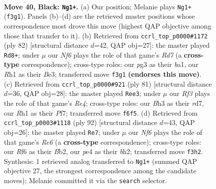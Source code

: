 \documentclass[11pt]{article}
\begin{document}
\clearpage

\begin{figure}[p]\centering
\begin{subfigure}{0.46\textwidth}\centering
\resizebox{\linewidth}{!}{%
\newchessgame
\chessboard[
  setfen={7k/R4p1p/3P1rp1/8/1p2P3/5nPb/4K2P/7r b - - 0 40},
  showmover=false,
  pgfstyle=straightmove, color=movearrow, markmove={f3-g1}
]}
\caption{}
\end{subfigure}\hfill
\begin{subfigure}{0.46\textwidth}\centering
\resizebox{\linewidth}{!}{%
\newchessgame
\chessboard[
  setfen={6k1/3R3p/2rN2p1/p1n5/P1p3P1/4B2P/5P2/b4K2 w - - 5 42},
  showmover=false,
  pgfstyle=straightmove, color=movearrow, markmove={d7-d8}
]}
\caption{}
\end{subfigure}
\\[4pt]
\begin{subfigure}{0.46\textwidth}\centering
\resizebox{\linewidth}{!}{%
\newchessgame
\chessboard[
  setfen={6k1/3R1pp1/N3p2p/P3r3/1p5P/1P4r1/5K2/R7 b - - 1 41},
  showmover=false,
  pgfstyle=straightmove, color=movearrow, markmove={e5-e3}
]}
\caption{}
\end{subfigure}\hfill
\begin{subfigure}{0.46\textwidth}\centering
\resizebox{\linewidth}{!}{%
\newchessgame
\chessboard[
  setfen={5r2/5P2/p3R3/1p3kpn/1P2N3/PK6/1B5b/8 w - - 1 47},
  showmover=false,
  pgfstyle=straightmove, color=movearrow, markmove={e6-e7}
]}
\caption{}
\end{subfigure}
\caption{\textbf{Move 40, Black: \texttt{Ng1+}.} (a) Our position; Melanie plays \texttt{Ng1+} (\texttt{f3g1}). Panels (b)--(d) are the retrieved master positions whose correspondence most drove this move (highest QAP objective among those that transfer to it). (b) Retrieved from \texttt{ccrl\_top\_p0000\#1172} (ply 82) [structural distance $d$=42, QAP obj=27]: the master played \texttt{Rd8+}; under $\mu$ our \emph{Nf6} plays the role of that game's \emph{Rd7} (a \textbf{cross-type} correspondence); cross-type roles: our \emph{p}g3 as their \emph{b}a1, our \emph{R}h1 as their \emph{B}e3; transferred move \texttt{f3g1} \textbf{(endorses this move)}. (c) Retrieved from \texttt{ccrl\_top\_p0000\#921} (ply 81) [structural distance $d$=36, QAP obj=28]: the master played \texttt{Ree3}; under $\mu$ our \emph{Rf3} plays the role of that game's \emph{Re4}; cross-type roles: our \emph{B}h3 as their \emph{r}d7, our \emph{R}h1 as their \emph{P}f7; transferred move \texttt{f6f5}. (d) Retrieved from \texttt{ccrl\_top\_p0003\#1118} (ply 92) [structural distance $d$=43, QAP obj=26]: the master played \texttt{Re7}; under $\mu$ our \emph{Nf6} plays the role of that game's \emph{Re6} (a \textbf{cross-type} correspondence); cross-type roles: our \emph{R}f6 as their \emph{B}b2, our \emph{p}e4 as their \emph{b}h2; transferred move \texttt{f3h2}. Synthesis: 1 retrieved analog transferred to \texttt{Ng1+} (summed QAP objective 27, the strongest correspondence among the candidate moves); Melanie committed it via the \texttt{search} selector.}
\label{fig:thought-m79}
\end{figure}
\end{document}

